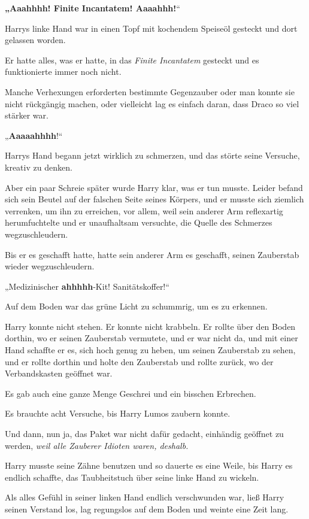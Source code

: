{\textbf{„Aaahhhh! Finite Incantatem! Aaaahhh!}“

Harrys linke Hand war in einen Topf mit kochendem Speiseöl gesteckt und dort gelassen worden.

Er hatte alles, was er hatte, in das \emph{Finite Incantatem} gesteckt und es funktionierte immer noch nicht.

Manche Verhexungen erforderten bestimmte Gegenzauber oder man konnte sie nicht rückgängig machen, oder vielleicht lag es einfach daran, dass Draco so viel stärker war.

„\textbf{Aaaaahhhh}!“

Harrys Hand begann jetzt wirklich zu schmerzen, und das störte seine Versuche, kreativ zu denken.

Aber ein paar Schreie später wurde Harry klar, was er tun musste. Leider befand sich sein Beutel auf der falschen Seite seines Körpers, und er musste sich ziemlich verrenken, um ihn zu erreichen, vor allem, weil sein anderer Arm reflexartig herumfuchtelte und er unaufhaltsam versuchte, die Quelle des Schmerzes wegzuschleudern.

Bis er es geschafft hatte, hatte sein anderer Arm es geschafft, seinen Zauberstab wieder wegzuschleudern.

„Medizinischer \textbf{ahhhhh}-Kit! Sanitätskoffer!“

Auf dem Boden war das grüne Licht zu schummrig, um es zu erkennen.

Harry konnte nicht stehen. Er konnte nicht krabbeln. Er rollte über den Boden dorthin, wo er seinen Zauberstab vermutete, und er war nicht da, und mit einer Hand schaffte er es, sich hoch genug zu heben, um seinen Zauberstab zu sehen, und er rollte dorthin und holte den Zauberstab und rollte zurück, wo der Verbandskasten geöffnet war.

Es gab auch eine ganze Menge Geschrei und ein bisschen Erbrechen.

Es brauchte acht Versuche, bis Harry Lumos zaubern konnte.

Und dann, nun ja, das Paket war nicht dafür gedacht, einhändig geöffnet zu werden, \emph{weil alle Zauberer Idioten waren, deshalb.}

Harry musste seine Zähne benutzen und so dauerte es eine Weile, bis Harry es endlich schaffte, das Taubheitstuch über seine linke Hand zu wickeln.

Als alles Gefühl in seiner linken Hand endlich verschwunden war, ließ Harry seinen Verstand los, lag regungslos auf dem Boden und weinte eine Zeit lang.

}
